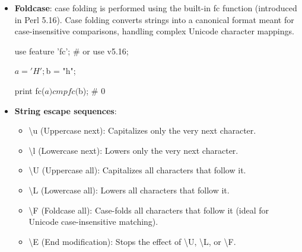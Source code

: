 \documentclass{report}
\begin{document}
    \pagebreak 
    \begin{itemize}
        \item \textbf{Foldcase}: case folding is performed using the built-in fc function (introduced in Perl 5.16). Case folding converts strings into a canonical format meant for case-insensitive comparisons, handling complex Unicode character mappings.
            \bigbreak \noindent 
            \begin{perlcode}
            use feature 'fc'; # or use v5.16;
            \end{perlcode}
            \bigbreak \noindent 
            \begin{perlcode}
                $a = 'H';
                $b = "h";

                print fc($a) cmp fc($b); # 0
            \end{perlcode}
        \item \textbf{String escape sequences}: 
            \begin{itemize}
                \item \textbackslash u (Uppercase next): Capitalizes only the very next character.
                \item \textbackslash l (Lowercase next): Lowers only the very next character.
                \item \textbackslash U (Uppercase all): Capitalizes all characters that follow it.
                \item \textbackslash L (Lowercase all): Lowers all characters that follow it.
                \item \textbackslash F (Foldcase all): Case-folds all characters that follow it (ideal for Unicode case-insensitive matching).
                \item \textbackslash E (End modification): Stops the effect of \textbackslash U, \textbackslash L, or \textbackslash F.
            \end{itemize}

    \end{itemize}
\end{document}
